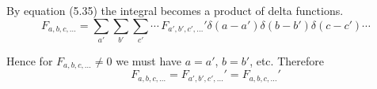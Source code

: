 By equation (5.35) the integral becomes a product of delta functions.
\begin{equation*}
F_{a,b,c,\ldots}
=\sum_{a'}\sum_{b'}\sum_{c'}\cdots\,F_{a',b',c',\ldots}'\delta(a-a')\delta(b-b')\delta(c-c')\cdots
\end{equation*}

Hence for $F_{a,b,c,\ldots}\ne0$ we must have $a=a'$, $b=b'$, etc.
Therefore
\begin{equation*}
F_{a,b,c,\ldots}=F_{a',b',c',\ldots}'=F_{a,b,c,\ldots}'
\end{equation*}



